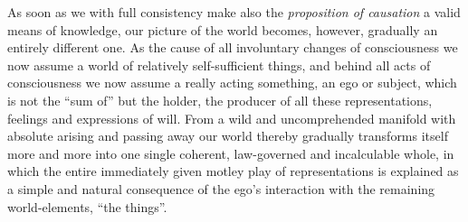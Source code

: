 \documentclass[12pt,a4paper,openany]{book}
\newcommand{\opage}[1]{\marginnote{\footnotesize\textit{[#1]}}}
\begin{document}
As soon as we with full consistency make also the \emph{proposition of causation} a valid
means of knowledge, our picture of the world becomes, however, gradually an entirely
different one. As the cause of all involuntary changes of consciousness we now assume a
world of relatively self-sufficient things, and behind all acts of consciousness we now
assume a really acting something, an ego or subject, which is not the ``sum of'' but the
holder, the producer of all these representations, feelings and expressions of will. From
a wild and uncomprehended manifold with absolute arising and passing away our world
thereby gradually transforms itself more and more into one single coherent, law-governed
and incalculable whole, in which the entire immediately given motley play of representations %
is explained as a simple and
\setcounter{footnote}{0}%
\opage{258}natural consequence of the ego's interaction with the remaining world-elements,
``the things''.
\end{document}
